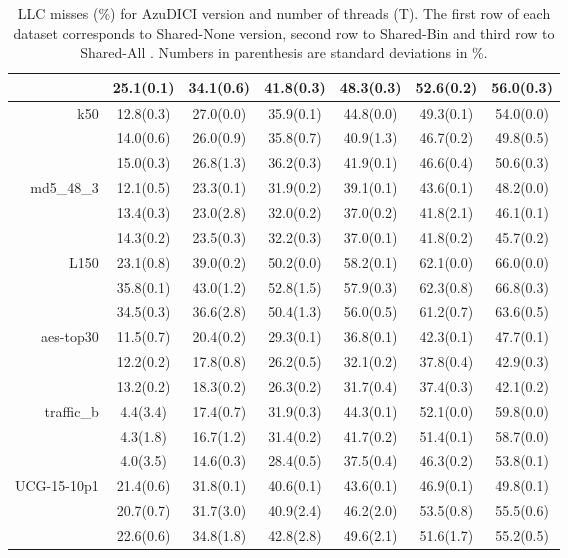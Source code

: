 \begin{table}[htbp]
\begin{tabular}[h]{rcccccc}
      &  25.1(0.1)		 &  34.1(0.6)		 &  41.8(0.3)		 &  48.3(0.3)		 &  52.6(0.2)		 &  56.0(0.3)		 \\ \hline
	  \multirow{3}{*}{k50}			 &  12.8(0.3)		 &  27.0(0.0)		 &  35.9(0.1)		 &  44.8(0.0)		 &  49.3(0.1)		 &  54.0(0.0)		 \\
      &  14.0(0.6)		 &  26.0(0.9)		 &  35.8(0.7)		 &  40.9(1.3)		 &  46.7(0.2)		 &  49.8(0.5)		 \\
      &  15.0(0.3)		 &  26.8(1.3)		 &  36.2(0.3)		 &  41.9(0.1)		 &  46.6(0.4)		 &  50.6(0.3)		 \\ \hline
	  \multirow{3}{*}{md5\_48\_3}		 &  12.1(0.5)		 &  23.3(0.1)		 &  31.9(0.2)		 &  39.1(0.1)		 &  43.6(0.1)		 &  48.2(0.0)		 \\
      &  13.4(0.3)		 &  23.0(2.8)		 &  32.0(0.2)		 &  37.0(0.2)		 &  41.8(2.1)		 &  46.1(0.1)		 \\
      &  14.3(0.2)		 &  23.5(0.3)		 &  32.2(0.3)		 &  37.0(0.1)		 &  41.8(0.2)		 &  45.7(0.2)		 \\ \hline
	  \multirow{3}{*}{L150}			 &  23.1(0.8)		 &  39.0(0.2)		 &  50.2(0.0)		 &  58.2(0.1)		 &  62.1(0.0)		 &  66.0(0.0)		 \\
      &  35.8(0.1)		 &  43.0(1.2)		 &  52.8(1.5)		 &  57.9(0.3)		 &  62.3(0.8)		 &  66.8(0.3)		 \\
      &  34.5(0.3)		 &  36.6(2.8)		 &  50.4(1.3)		 &  56.0(0.5)		 &  61.2(0.7)		 &  63.6(0.5)		 \\ \hline
	  \multirow{3}{*}{aes-top30}		 &  11.5(0.7)		 &  20.4(0.2)		 &  29.3(0.1)		 &  36.8(0.1)		 &  42.3(0.1)		 &  47.7(0.1)		 \\
      &  12.2(0.2)		 &  17.8(0.8)		 &  26.2(0.5)		 &  32.1(0.2)		 &  37.8(0.4)		 &  42.9(0.3)		 \\
      &  13.2(0.2)		 &  18.3(0.2)		 &  26.3(0.2)		 &  31.7(0.4)		 &  37.4(0.3)		 &  42.1(0.2)		 \\ \hline
	  \multirow{3}{*}{traffic\_b}		 &  4.4(3.4)		 &  17.4(0.7)		 &  31.9(0.3)		 &  44.3(0.1)		 &  52.1(0.0)		 &  59.8(0.0)		 \\
      &  4.3(1.8)		 &  16.7(1.2)		 &  31.4(0.2)		 &  41.7(0.2)		 &  51.4(0.1)		 &  58.7(0.0)		 \\
      &  4.0(3.5)		 &  14.6(0.3)		 &  28.4(0.5)		 &  37.5(0.4)		 &  46.3(0.2)		 &  53.8(0.1)		 \\ \hline
	  \multirow{3}{*}{UCG-15-10p1}	 &  21.4(0.6)		 &  31.8(0.1)		 &  40.6(0.1)		 &  43.6(0.1)		 &  46.9(0.1)		 &  49.8(0.1)		 \\
      &  20.7(0.7)		 &  31.7(3.0)		 &  40.9(2.4)		 &  46.2(2.0)		 &  53.5(0.8)		 &  55.5(0.6)		 \\
      &  22.6(0.6)		 &  34.8(1.8)		 &  42.8(2.8)		 &  49.6(2.1)		 &  51.6(1.7)		 &  55.2(0.5)		 \\ \hline    \end{tabular}
    \normalsize
    \caption{LLC misses (\%) for AzuDICI version and number of threads (T). The first row of each dataset corresponds to Shared-None version, second row to Shared-Bin and third row to Shared-All  . Numbers in parenthesis are standard deviations in \%.}
    \label{tab:dstable}
  \end{table}
  
